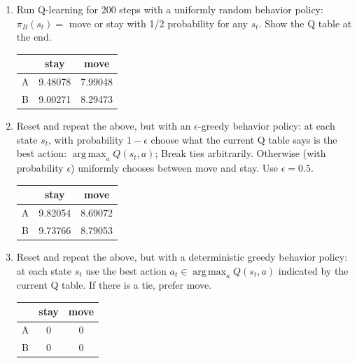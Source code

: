 \documentclass[a4paper]{article}
\theoremstyle{definition}
\DeclareMathOperator*{\argmax}{arg\,max}
\newenvironment{soln}{
    \leavevmode\color{blue}\ignorespaces
}{}
\begin{document}
\begin{enumerate}
\item Run Q-learning for 200 steps with a uniformly random behavior policy: $\pi_B(s_t)=$ move or stay with 1/2 probability for any $s_t$.
Show the Q table at the end.

\begin{soln}

\begin{center}
\begin{tabular}{ |c|c|c| } 
 \hline
  & stay& move \\ 
 \hline
 A & 9.48078 & 7.99048 \\ 
 \hline
B & 9.00271& 8.29473\\ 
 \hline
\end{tabular}
\end{center}

\end{soln}

\item Reset and repeat the above, but with an $\epsilon$-greedy behavior policy: at each state $s_t$, with probability $1-\epsilon$ choose what the current Q table says is the best action: $\argmax_a Q(s_t,a)$; Break ties arbitrarily. Otherwise (with probability $\epsilon$) uniformly chooses between move and stay.
Use $\epsilon=0.5$.

\begin{soln}

\begin{center}
\begin{tabular}{ |c|c|c| } 
 \hline
  & stay& move \\ 
 \hline
 A & 9.82054 & 8.69072 \\ 
 \hline
B & 9.73766& 8.79053\\ 
 \hline
\end{tabular}
\end{center}

\end{soln}

\item Reset and repeat the above, but with a deterministic greedy behavior policy: at each state $s_t$ use the best action $a_t \in \argmax_a Q(s_t,a)$ indicated by the current Q table. If there is a tie, prefer move.

\begin{soln}

\begin{center}
\begin{tabular}{ |c|c|c| } 
 \hline
  & stay& move \\ 
 \hline
 A & 0 & 0 \\ 
 \hline
B & 0& 0\\ 
 \hline
\end{tabular}
\end{center}


\end{soln}
\end{enumerate}
\end{document}
